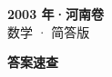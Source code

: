 \documentclass[zihao=-4, a4paper]{ctexart}
\begin{document}
\begin{center}
  {\Large\bfseries 2003 年·河南卷}\\[4pt]
  {\large 数学 · 简答版}
\end{center}
\medskip
{}

\clearpage
{}
\begin{center}{\Large\bfseries 答案速查}\end{center}
\medskip

\end{document}
